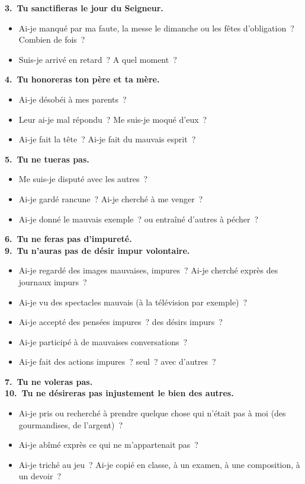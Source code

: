 \documentclass[%
a5paper%
,11pt%
,DIV=15%
,titlepage=on%
,headings=optiontoheadandtoc%
,headings=small%
,parskip=false%
,titlepage%
,openany%
]{scrbook}
\newcommand{\commandement}[1]{\noindent\textbf{#1}}
\begin{document}
\commandement{3. Tu sanctifieras le jour du Seigneur.}
\begin{itemize}
\item Ai-je manqué par ma faute, la messe le dimanche ou les fêtes d’obligation ? Combien de fois ?
\item Suis-je arrivé en retard ? A quel moment ?
\end{itemize}

\commandement{4. Tu honoreras ton père et ta mère.}
\begin{itemize}
\item Ai-je désobéi à mes parents ?
\item Leur ai-je mal répondu ? Me suis-je moqué d’eux ?
\item Ai-je fait la tête ? Ai-je fait du mauvais esprit ?
\end{itemize}

\commandement{5. Tu ne tueras pas.}
\begin{itemize}
\item Me suis-je disputé avec les autres ?
\item Ai-je gardé rancune ? Ai-je cherché à me venger ?
\item Ai-je donné le mauvais exemple ? ou entraîné d’autres à pécher ?
\end{itemize}

\commandement{6. Tu ne feras pas d'impureté.\\
9. Tu n'auras pas de désir impur volontaire.}
\begin{itemize}
\item Ai-je regardé des images mauvaises, impures ? Ai-je cherché exprès des journaux impurs ?
\item Ai-je vu des spectacles mauvais (à la télévision par exemple) ?
\item Ai-je accepté des pensées impures ? des désirs impurs ?
\item Ai-je participé à de mauvaises conversations ?
\item Ai-je fait des actions impures ? seul ? avec d’autres ?
\end{itemize}

\commandement{7. Tu ne voleras pas.\\
10. Tu ne désireras pas injustement le bien des autres.}
\begin{itemize}
\item Ai-je pris ou recherché à prendre quelque chose qui n’était pas à moi (des gourmandises, de l’argent) ?
\item Ai-je abîmé exprès ce qui ne m’appartenait pas ?
\item Ai-je triché au jeu ? Ai-je copié en classe, à un examen, à une composition, à un devoir ?
\end{itemize}
\end{document}

